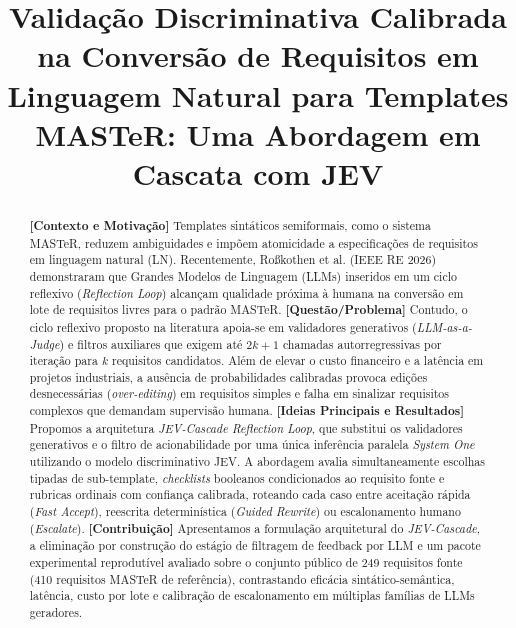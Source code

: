 \documentclass[conference]{IEEEtran}
\begin{document}
\title{ Validação Discriminativa Calibrada na Conversão de Requisitos em Linguagem Natural para Templates MASTeR: Uma Abordagem em Cascata com JEV }

\author{
}

\maketitle

\begin{abstract}
\textbf{[Contexto e Motivação]} Templates sintáticos semiformais, como o sistema MASTeR, reduzem ambiguidades e impõem atomicidade a especificações de requisitos em linguagem natural (LN). Recentemente, Ro\ss kothen et al. (IEEE RE 2026) demonstraram que Grandes Modelos de Linguagem (LLMs) inseridos em um ciclo reflexivo (\textit{Reflection Loop}) alcançam qualidade próxima à humana na conversão em lote de requisitos livres para o padrão MASTeR. \textbf{[Questão/Problema]} Contudo, o ciclo reflexivo proposto na literatura apoia-se em validadores generativos (\textit{LLM-as-a-Judge}) e filtros auxiliares que exigem até $2k + 1$ chamadas autorregressivas por iteração para $k$ requisitos candidatos. Além de elevar o custo financeiro e a latência em projetos industriais, a ausência de probabilidades calibradas provoca edições desnecessárias (\textit{over-editing}) em requisitos simples e falha em sinalizar requisitos complexos que demandam supervisão humana. \textbf{[Ideias Principais e Resultados]} Propomos a arquitetura \textit{JEV-Cascade Reflection Loop}, que substitui os validadores generativos e o filtro de acionabilidade por uma única inferência paralela \textit{System One} utilizando o modelo discriminativo JEV. A abordagem avalia simultaneamente escolhas tipadas de sub-template, \textit{checklists} booleanos condicionados ao requisito fonte e rubricas ordinais com confiança calibrada, roteando cada caso entre aceitação rápida (\textit{Fast Accept}), reescrita determinística (\textit{Guided Rewrite}) ou escalonamento humano (\textit{Escalate}). \textbf{[Contribuição]} Apresentamos a formulação arquitetural do \textit{JEV-Cascade}, a eliminação por construção do estágio de filtragem de feedback por LLM e um pacote experimental reprodutível avaliado sobre o conjunto público de 249 requisitos fonte (410 requisitos MASTeR de referência), contrastando eficácia sintático-semântica, latência, custo por lote e calibração de escalonamento em múltiplas famílias de LLMs geradores.
\end{abstract}
\end{document}
